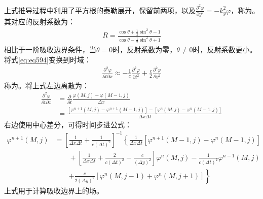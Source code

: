 \documentclass{article}
\numberwithin{equation}{section}
\begin{document}
上式推导过程中利用了平方根的泰勒展开，保留前两项，以及$\frac{\partial^2\varphi}{\partial y^2}=-k_y^2\varphi$，称为\textbf{\color{blue}{二阶吸收边界条件}}。其对应的反射系数为：
\begin{align}
    \label{eq:eq595}
    R=\frac{\cos\theta+\frac{1}{2}\sin^2\theta-1}{\cos\theta-\frac{1}{2}\sin^2\theta+1}
\end{align}
相比于一阶吸收边界条件，当$\theta=0$时，反射系数为零，$\theta\neq0$时，反射系数更小。将式\ref{eq:eq594}变换到时域：
\begin{align}
    \label{eq:eq596}
    \frac{\partial^2 \varphi}{\partial t\partial x}\approx-\frac{1}{c}\frac{\partial^2 \varphi}{\partial t^2}+\frac{c}{2}\frac{\partial^2 \varphi}{\partial y^2}
\end{align}
称为\textbf{\color{blue}{Engquist-Majda吸收边界条件}}。将上式左边离散为：
\begin{align}
    \label{eq:eq597}
    \frac{\partial^2 \varphi}{\partial t\partial x}&=\frac{\partial}{\partial t}\frac{\varphi(M,j)-\varphi(M-1,j)}{\Delta x} \nonumber \\
                                                   &=\frac{[\varphi^{n+1}(M,j)-\varphi^{n+1}(M-1,j)]-[\varphi^{n}(M,j)-\varphi^{n}(M-1,j)]}{\Delta x\Delta t}
\end{align}
右边使用中心差分，可得时间步进公式：
\begin{align}
    \label{eq:eq598}
    \varphi^{n+1}(M,j)&=\left[\frac{1}{\Delta x\Delta t}+\frac{1}{c(\Delta t)^2}\right]^{-1}\left\{\frac{1}{\Delta x\Delta t}\left[\varphi^{n+1}(M-1,j)-\varphi^{n}(M-1,j)\right]\right. \nonumber \\
                      &\qquad+\left[\frac{1}{\Delta x\Delta t}+\frac{2}{c(\Delta t)^2}-\frac{c}{(\Delta y)^2}\right]\varphi^{n}(M,j)-\frac{1}{c(\Delta t)^2}\varphi^{n-1}(M,j) \nonumber \\
                      &\qquad\left.+\frac{c}{2(\Delta y)^2}\left[\varphi^{n}(M,j-1)+\varphi^{n}(M,j+1)\right]\right\}
\end{align}
上式用于计算吸收边界上的场。
\end{document}
